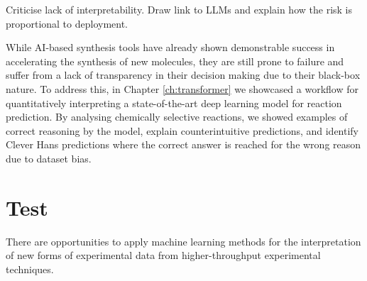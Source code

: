 


Criticise lack of interpretability. Draw link to LLMs and explain how the risk is proportional to deployment.

While AI-based synthesis tools have already shown demonstrable success in accelerating the synthesis of new molecules, they are still prone to failure and suffer from a lack of transparency in their decision making due to their black-box nature. To address this, in Chapter \ref{ch:transformer} we showcased a workflow for quantitatively interpreting a state-of-the-art deep learning model for reaction prediction. By analysing chemically selective reactions, we showed examples of correct reasoning by the model, explain counterintuitive predictions, and identify Clever Hans predictions where the correct answer is reached for the wrong reason due to dataset bias.

\section*{Test}

There are opportunities to apply machine learning methods for the interpretation of new forms of experimental data from higher-throughput experimental techniques.

